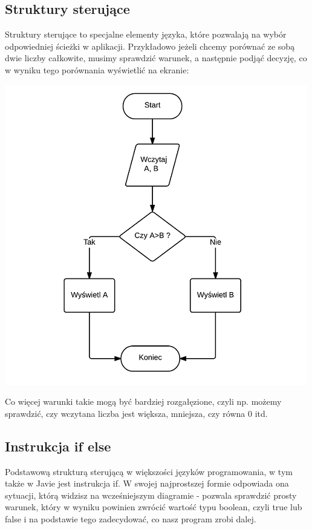 \documentclass[letterpaper,10pt,english]{sphinxmanual}
\begin{document}
\subsection{Struktury sterujące}
\label{sterowanie:struktury-sterujace}
Struktury sterujące to specjalne elementy języka, które pozwalają na wybór odpowiedniej ścieżki w aplikacji. Przykładowo jeżeli chcemy porównać ze sobą dwie liczby całkowite, musimy sprawdzić warunek, a następnie podjąć decyzję, co w wyniku tego porównania wyświetlić na ekranie:

{\hfill\includegraphics{algo.png}\hfill}

Co więcej warunki takie mogą być bardziej rozgałęzione, czyli np. możemy sprawdzić, czy wczytana liczba jest większa, mniejsza, czy równa 0 itd.


\subsection{Instrukcja if else}
\label{sterowanie:instrukcja-if-else}
Podstawową strukturą sterującą w większości języków programowania, w tym także w Javie jest instrukcja if. W swojej najprostszej formie odpowiada ona sytuacji, którą widzisz na wcześniejszym diagramie - pozwala sprawdzić prosty warunek, który w wyniku powinien zwrócić wartość typu boolean, czyli true lub false i na podstawie tego zadecydować, co nasz program zrobi dalej.
\end{document}
